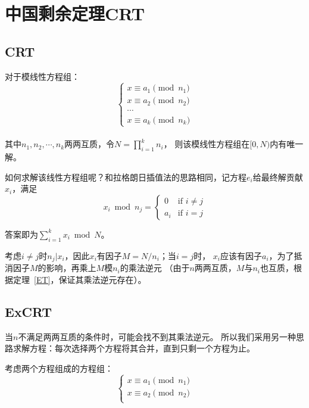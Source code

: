 \section{中国剩余定理CRT}
\subsection{CRT}
\begin{theorem}
	对于模线性方程组：
	\begin{displaymath}
		\left\{\begin{array}{l}
			x \equiv a_1 \pmod{n_1} \\
			x \equiv a_2 \pmod{n_2} \\
			\cdots                  \\
			x \equiv a_k \pmod{n_k}
		\end{array}\right.
	\end{displaymath}\\
	其中$n_1,n_2,\cdots,n_k$两两互质，令$\displaystyle N=\prod_{i=1}^k{n_i}$，
	则该模线性方程组在$[0,N)$内有唯一解。
\end{theorem}

如何求解该线性方程组呢？和拉格朗日插值法的思路相同，记方程$e_i$给最终解贡献$x_i$，满足
\begin{displaymath}
	x_i \bmod n_j =
	\left\{\begin{array}{ll}
		0   & \textrm{if $i\neq j$} \\
		a_i & \textrm{if $i=j$}
	\end{array}\right.
\end{displaymath}

答案即为$\displaystyle \sum_{i=1}^k{x_i} \bmod N$。

考虑$i\neq j$时$n_j|x_i$，因此$x_i$有因子$M=N/n_i$；当$i=j$时，
$x_i$应该有因子$a_i$，为了抵消因子$M$的影响，再乘上$M$模$n_i$的乘法逆元
（由于$n$两两互质，$M$与$n_i$也互质，根据定理~\ref{ET}，保证其乘法逆元存在）。
\subsection{ExCRT}
当$n$不满足两两互质的条件时，可能会找不到其乘法逆元。
所以我们采用另一种思路求解方程：每次选择两个方程将其合并，直到只剩一个方程为止。

考虑两个方程组成的方程组：
\begin{displaymath}
	\left\{\begin{array}{l}
		x \equiv a_1 \pmod{n_1} \\
		x \equiv a_2 \pmod{n_2} \\
	\end{array}\right.
\end{displaymath}

